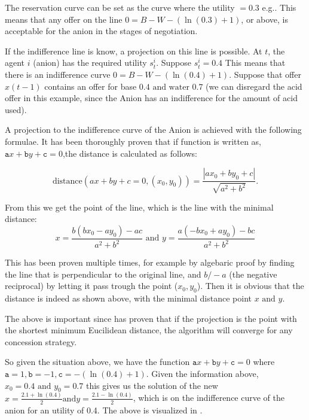 The reservation curve can be set as the curve where the utility $= 0.3$ e.g.. This means that any offer on the line $0 = B - W - (\ln(0.3)+1)$, or above, is acceptable for the anion in the stages of negotiation.


If the indifference line is know, a projection on this line is possible. 
At $t$, the agent $i$ (anion) has the required utility $s^i_t$. Suppose $s^i_t = 0.4$ This means that there is an indifference curve $0 = B - W - (\ln(0.4)+1)$. Suppose that offer $x(t-1)$ contains an offer for base $0.4 \text{ and water } 0.7$ (we can disregard the acid offer in this example, since the Anion has an indifference for the amount of acid used). 

A projection to the indifference curve of the Anion is achieved with the following formulae. It has been thoroughly proven that if function is written as, $\texttt{a} x + \texttt{b} y + \texttt{c} = 0$,the distance is calculated as follows:

\[\text{distance}(ax+by+c=0, (x_0, y_0)) = \frac{|ax_0+by_0+c|}{\sqrt{a^2+b^2}}. \]

From this we get the point of the line, which is the line with the minimal distance:
\[x = \frac{b(bx_0 - ay_0)-ac}{a^2 + b^2} \text{ and } y = \frac{a(-bx_0 + ay_0) - bc}{a^2+b^2}\]

This has been proven multiple times, for example by algebaric proof by finding the line that is perpendicular to the original line, and $b/-a$ (the negative reciprocal) by letting it pass trough the point ($x_0, y_0$). Then it is obvious that the distance is indeed as shown above, with the minimal distance point $x \text{ and }y$.

The above is important since \citet{zheng2015automated} has proven that if the projection is the point with the shortest minimum Eucilidean distance, the algorithm will converge for any concession strategy.

So given the situation above, we have the function $\texttt{a} x + \texttt{b} y + \texttt{c} = 0$ where $\texttt{a} = 1, \texttt{b} = -1, \texttt{c} = -(\ln(0.4)+1)$. Given the information above, $x_0 = 0.4 \text{ and } y_0 = 0.7$ this gives us the solution of the new $x=\frac{2.1 + \ln(0.4)}{2} \text{and} y = \frac{2.1 - \ln(0.4)}{2}$, which is on the indifference curve of the anion for an utility of 0.4.
The above is visualized in .

